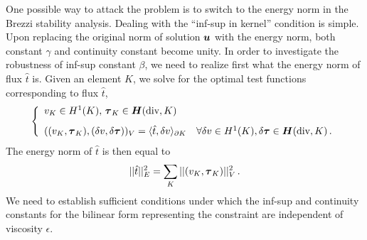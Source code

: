 \documentclass[Proposal.tex]{subfiles}
\begin{document}
One possible way to attack the problem is to switch to the energy norm in the Brezzi stability
analysis. Dealing with the ``inf-sup in kernel'' condition is simple. Upon replacing
the original norm of solution $\boldsymbol u$ with the energy norm, both constant $\gamma$ and continuity
constant become unity. In order to investigate the robustness of inf-sup  constant $\beta$,
we need to realize first what the energy norm of flux $\hat{t}$ is. Given an element $K$,
we solve for the optimal test functions corresponding to flux $\hat{t}$,
\begin{equation}
\left\{
\begin{array}{ll}
v_K \in H^1(K),\, \boldsymbol\tau_K \in \mbox{\boldmath $H$}(\text{div},K)\\[8pt]
((v_K,\boldsymbol\tau_K), (\delta v,\delta \boldsymbol\tau))_V = \langle \hat{t},\delta v\rangle_{\partial K}
\quad \forall \delta v \in H^1(K), \delta \boldsymbol\tau \in \mbox{\boldmath $H$}(\text{div},K)\,.
\end{array}
\right.
\label{eq:local_problem}
\end{equation}
The energy norm of $\hat{t}$ is then equal to
\begin{equation}
|| \hat{t} ||_E^2 = \sum_K || (v_K,\boldsymbol\tau_K) ||_V^2\,.
\end{equation}
We need to establish sufficient conditions under which the inf-sup and continuity constants for
the bilinear form representing the constraint are independent of viscosity $\epsilon$.
\end{document}
